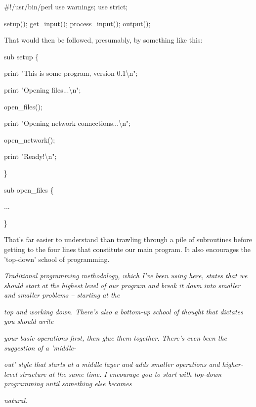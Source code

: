 \documentclass[a4paper,11pt]{book}
\begin{document}
\noindent 

\noindent \#!/usr/bin/perl use warnings; use strict;

\noindent 

\noindent setup(); get\_input(); process\_input(); output();

\noindent 

\noindent That would then be followed, presumably, by something like this:

\noindent 

\noindent sub setup \{

\noindent print "This is some program, version 0.1\textbackslash n";

\noindent print "Opening files...\textbackslash n";

\noindent open\_files();

\noindent print "Opening network connections...\textbackslash n";

\noindent open\_network();

\noindent print "Ready!\textbackslash n";

\noindent \}

\noindent 

\noindent sub open\_files \{

\noindent ...

\noindent \}

\noindent 

\noindent That's far easier to understand than trawling through a pile of subroutines before getting to the four lines that constitute our main program. It also encourages the 'top-down' school of programming.

\noindent 

\noindent \textit{Traditional programming methodology, which I've been using here, states that we should start at the highest level of our program and break it down into smaller and smaller problems -- starting at the}

\noindent \textit{top and working down. There's also a bottom-up school of thought that dictates you should write}

\noindent \textit{your basic operations first, then glue them together. There's even been the suggestion of a 'middle-}

\noindent \textit{out' style that starts at a middle layer and adds smaller operations and higher-level structure at the same time. I encourage you to start with top-down programming until something else becomes}

\noindent \textit{natural.}
\end{document}
